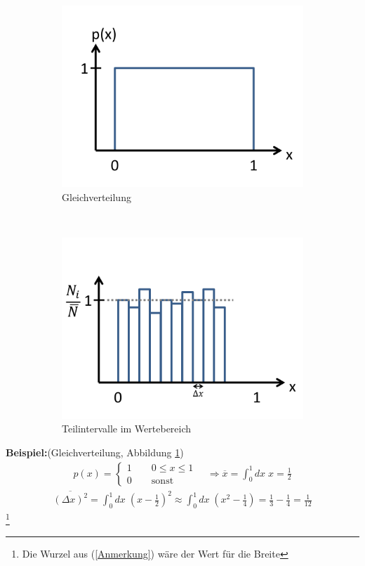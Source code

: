 \documentclass[12pt]{article}
\begin{document}
\begin{figure}[h]
		\begin{subfigure}[h]{0.5 \textwidth}
		\centering
		\includegraphics[width=\textwidth]{Folie9.png}
		\caption{Gleichverteilung} 
		\label{fig:Gleichverteilung}
		\centering
	\end{subfigure}
	~
	\begin{subfigure}[h]{0.5\textwidth}
		\centering
		\includegraphics[width=\textwidth]{Folie11.png}
		\caption{Teilintervalle im Wertebereich} 
		\label{fig:Teilintervall}
		\centering
	\end{subfigure}
	\caption{ }
\end{figure}

\textbf{Beispiel:}(Gleichverteilung, Abbildung \ref{fig:Gleichverteilung}) 
\begin{align*}
p(x) = 
\begin{cases}
1  \quad \quad 0 \leq x \leq 1 \\
0  \quad \quad  \text{sonst}
\end{cases}
\quad \Rightarrow \overline{x}= \int_0^1 dx \; x = \frac{1}{2}
\end{align*}
\begin{align*}
\overline{(\Delta x)^2} = \int_0^1 dx \; (x-\frac{1}{2})^2 \approx  \int_0^1 dx \; (x^2-\frac{1}{4}) = \frac{1}{3} - \frac{1}{4} = \frac{1}{12}   \label{Anmerkung}
\end{align*} \footnote{Die Wurzel aus (\ref{Anmerkung}) wäre der Wert für die Breite }
\end{document}
